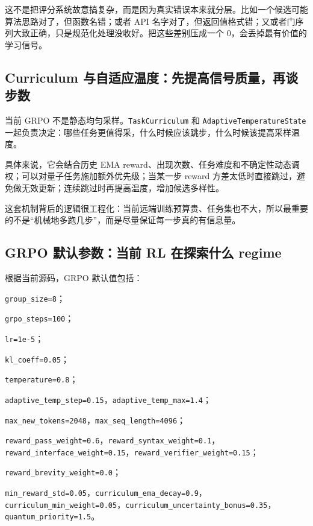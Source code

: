 \documentclass[11pt,a4paper]{article}
\newcommand{\code}[1]{\begingroup\ttfamily\footnotesize\nolinkurl{#1}\endgroup}
\begin{document}
这不是把评分系统故意搞复杂，而是因为真实错误本来就分层。比如一个候选可能算法思路对了，但函数名错；或者 API 名字对了，但返回值格式错；又或者门序列大致正确，只是规范化处理没收好。把这些差别压成一个 0，会丢掉最有价值的学习信号。

\subsection{Curriculum 与自适应温度：先提高信号质量，再谈步数}

当前 GRPO 不是静态均匀采样。\code{TaskCurriculum} 和 \code{AdaptiveTemperatureState} 一起负责决定：哪些任务更值得采，什么时候应该跳步，什么时候该提高采样温度。

具体来说，它会结合历史 EMA reward、出现次数、任务难度和不确定性动态调权；可以对量子任务施加额外优先级；当某一步 reward 方差太低时直接跳过，避免做无效更新；连续跳过时再提高温度，增加候选多样性。

这套机制背后的逻辑很工程化：当前远端训练预算贵、任务集也不大，所以最重要的不是“机械地多跑几步”，而是尽量保证每一步真的有信息量。

\subsection{GRPO 默认参数：当前 RL 在探索什么 regime}

根据当前源码，GRPO 默认值包括：

  \par \code{group\_size=8}；
  \par \code{grpo\_steps=100}；
  \par \code{lr=1e-5}；
  \par \code{kl\_coeff=0.05}；
  \par \code{temperature=0.8}；
  \par \code{adaptive\_temp\_step=0.15}，\code{adaptive\_temp\_max=1.4}；
  \par \code{max\_new\_tokens=2048}，\code{max\_seq\_length=4096}；
  \par \code{reward\_pass\_weight=0.6}，\code{reward\_syntax\_weight=0.1}，\code{reward\_interface\_weight=0.15}，\code{reward\_verifier\_weight=0.15}；
  \par \code{reward\_brevity\_weight=0.0}；
  \par \code{min\_reward\_std=0.05}，\code{curriculum\_ema\_decay=0.9}，\code{curriculum\_min\_weight=0.05}，\code{curriculum\_uncertainty\_bonus=0.35}，\code{quantum\_priority=1.5}。
\end{document}
